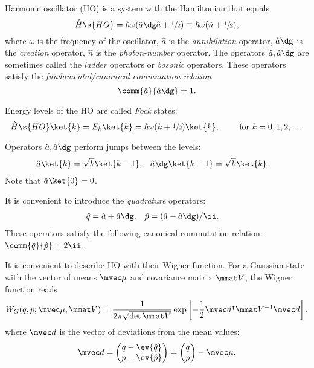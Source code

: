 \documentclass[fontsize=9pt,bookmarkpackage=false]{scrartcl}
\renewcommand{\hbar}{\hslash}
\begin{document}
Harmonic oscillator (HO) is a system with the Hamiltonian that equals
\begin{equation}
  \hat H\s{HO} = \hbar \omega ( \hat a\dg \hat a +  \sfrac 12 ) \equiv \hbar \omega ( \hat n + \sfrac 12 ),
\end{equation}
where $\omega$ is the frequency of the oscillator, $\hat a$ is the \emph{annihilation} operator, $\hat a\dg$ is the \emph{creation} operator, $\hat n$ is the \emph{photon-number} operator.
The operators $\hat a, \hat a\dg$ are sometimes called the \emph{ladder} operators or \emph{bosonic} operators.
These operators satisfy the \emph{fundamental/canonical commutation relation}
\begin{equation}
  \comm{ \hat a }{ \hat a \dg } = 1.
\end{equation}

Energy levels of the HO are called \emph{Fock} states:
\begin{equation}
  \hat H\s{HO} \ket{ k } = E_k \ket{ k } = \hbar \omega ( k + \sfrac 12 ) \ket{ k },
  \qquad
  \text{ for }
  k = 0,1,2,\dots
\end{equation}

Operators $\hat a, \hat a\dg$ perform jumps between the levels:
\begin{align}
  \hat a \ket{ k }        & = \sqrt{ k } \ket{ k - 1 }, &
  \hat a\dg \ket{ k - 1 } & = \sqrt{ k } \ket {k }.
\end{align}
Note that $\hat a \ket{0} = 0$.

It is convenient to introduce the \emph{quadrature} operators:
\begin{align}
  \hat q & = \hat a + \hat a\dg, &
  \hat p & = ( \hat a - \hat a\dg ) / \ii.
\end{align}
These operators satisfy the following canonical commutation relation: $\comm{ \hat q }{ \hat p } = 2 \ii$.

It is convenient to describe HO with their Wigner function.
For a Gaussian state with the vector of means $\mvec \mu$ and covariance matrix $\mmat V$, the Wigner function reads
\begin{equation}
  W_G ( q , p ; \mvec \mu, \mmat V )
  =
  \frac{ 1 }{ 2 \pi \sqrt{ \det \mmat V }}
  \exp\left[
    - \frac 12 \mvec d^\intercal \mmat V^{-1}  \mvec d
  \right],
\end{equation}
where $\mvec d$ is the vector of deviations from the mean values:
\begin{equation}
  \mvec d
  =
  \begin{pmatrix}
    q - \ev{ \hat q } \\ p - \ev{ \hat p }
  \end{pmatrix}
  =
  \begin{pmatrix}
    q \\ p
  \end{pmatrix}- \mvec \mu.
\end{equation}
\end{document}
